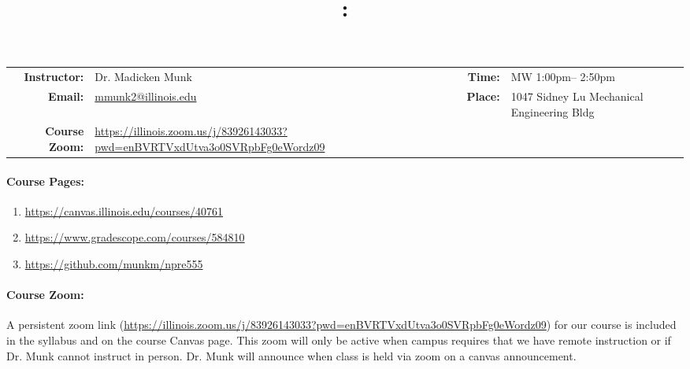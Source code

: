 \documentclass[11pt, a4paper]{article}
\title{\CourseNumber: \CourseTitle\\}
\author{\CourseUniversity}
\date{\CourseSemester \CourseYear}
\makeatletter
\newcommand{\CourseDays}{MW\xspace}%
\newcommand{\CourseStart}{1:00pm\xspace}%
\newcommand{\CourseEnd}{2:50pm\xspace}%
\newcommand{\CourseInstructor}{Dr. Madicken Munk}
\newcommand{\CourseInstructorEmail}{mmunk2@illinois.edu}
\newcommand{\CourseRoom}{1047\xspace}%
\newcommand{\CourseBuilding}{Sidney Lu Mechanical Engineering Bldg\xspace}%
\newcommand{\CourseZoom}{https://illinois.zoom.us/j/83926143033?pwd=enBVRTVxdUtva3o0SVRpbFg0eWordz09}%
\newcommand{\TeachingAssistant}{Sun Myung Park\xspace}%
\newcommand{\TAOfficeHourDays}{Wednesdays\xspace}%
\newcommand{\TAOfficeHourStart}{1:00pm\xspace}%
\newcommand{\TAOfficeHourEnd}{3:00pm\xspace}%
\newcommand{\TAOfficeHourPlace}{123 Talbot Laboratory\xspace}
\makeatother
\begin{document}
\maketitle
\renewcommand{\arraystretch}{2}
\begin{center}
\begin{table}[h]
\begin{tabularx}{\textwidth}{rXrX}
\hline
\textbf{Instructor:} & \CourseInstructor & \textbf{Time:} & \CourseDays \CourseStart -- \CourseEnd \\
\textbf{Email:} &  \href{mailto:\CourseInstructorEmail}{\CourseInstructorEmail} & \textbf{Place:} & \CourseRoom \CourseBuilding\\
\textbf{Course Zoom:} & \url{\CourseZoom} & & \\
\hline
\end{tabularx}

\end{table}
\end{center}

\paragraph{Course Pages:}
\begin{enumerate}
        \item \url{https://canvas.illinois.edu/courses/40761}
        \item \url{https://www.gradescope.com/courses/584810}
        \item \url{https://github.com/munkm/npre555}
\end{enumerate}


\paragraph{Course Zoom:} A persistent zoom link (\url{\CourseZoom})
for our course is included in
the syllabus and on the course Canvas page.
This zoom will only be active when campus
requires that we have remote instruction or if Dr. Munk cannot instruct in
person. Dr. Munk will announce when class is held via zoom on a canvas
announcement.
\end{document}
